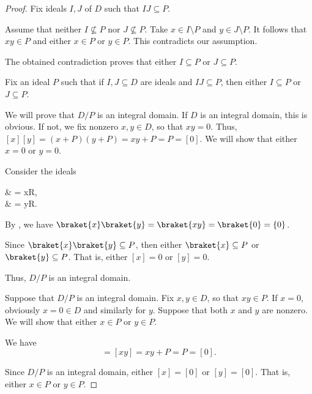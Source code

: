 \begin{proof}
   Fix ideals \( I, J \) of \( D \) such that \( IJ \subseteq P \).

  Assume that neither \( I \not\subseteq P \) nor \( J \not\subseteq P \). Take \( x \in I \setminus P \) and \( y \in J \setminus P \). It follows that \( xy \in P \) and either \( x \in P \) or \( y \in P \). This contradicts our assumption.

  The obtained contradiction proves that either \( I \subseteq P \) or \( J \subseteq P \).

   Fix an ideal \( P \) such that if \( I, J \subseteq D \) are ideals and \( IJ \subseteq P \), then either \( I \subseteq P \) or \( J \subseteq P \).

  We will prove that \( D / P \) is an integral domain. If \( D \) is an integral domain, this is obvious. If not, we fix nonzero \( x, y \in D \), so that \( xy = 0 \). Thus, \( [x][y] = (x + P)(y + P) = xy + P = P = [0] \). We will show that either \( x = 0 \) or \( y = 0 \).

  Consider the ideals
  \begin{balign*}
     & = xR, \\
     & = yR.
  \end{balign*}

  By , we have \( \braket{x} \braket{y} = \braket{xy} = \braket{0} = \{ 0 \} \).

  Since \( \braket{x} \braket{y} \subseteq P \), then either \( \braket{x} \subseteq P \) or \( \braket{y} \subseteq P \). That is, either \( [x] = 0 \) or \( [y] = 0 \).

  Thus, \( D / P \) is an integral domain.

   Suppose that \( D / P \) is an integral domain. Fix \( x, y \in D \), so that \( xy \in P \). If \( x = 0 \), obviously \( x = 0 \in D \) and similarly for \( y \). Suppose that both \( x \) and \( y \) are nonzero. We will show that either \( x \in P \) or \( y \in P \).

  We have
  \begin{equation*}
    [x][y] = [xy] = xy + P = P = [0].
  \end{equation*}

  Since \( D / P \) is an integral domain, either \( [x] = [0] \) or \( [y] = [0] \). That is, either \( x \in P \) or \( y \in P \).
\end{proof}

